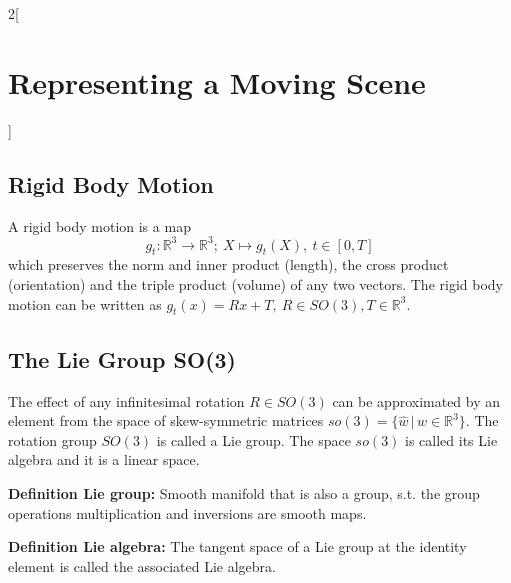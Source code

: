 \documentclass[oneside,fontsize=11pt,paper=a4]{scrartcl}
\begin{document}
\begin{multicols}{2}[\section{Representing a Moving Scene}]
\subsection{Rigid Body Motion}
A rigid body motion is a map
\begin{equation*}
	g_t: \mathbb{R}^3 \rightarrow \mathbb{R}^3; \ X \mapsto g_t(X), \ t \in [0,T]
\end{equation*}
which preserves the norm and inner product (length), the cross product (orientation) and the triple product (volume) of any two vectors.
The rigid body motion can be written as $g_t(x) = Rx + T, \ R \in SO(3), T \in \mathbb{R}^3$.\par

\subsection{The Lie Group SO(3)}
The effect of any infinitesimal rotation $R \in SO(3)$ can be approximated by an element from the space of skew-symmetric matrices $so(3) = \{\hat{w} \, \vert \, w \in \mathbb{R}^3\}$.
The rotation group $SO(3)$ is called a Lie group.
The space $so(3)$ is called its Lie algebra and it is a linear space.\par

\textbf{Definition Lie group:} Smooth manifold that is also a group, s.t. the group operations multiplication and inversions are smooth maps.\\\par

\textbf{Definition Lie algebra:} The tangent space of a Lie group at the identity element is called the associated Lie algebra.\\\par


\end{multicols}
\end{document}
